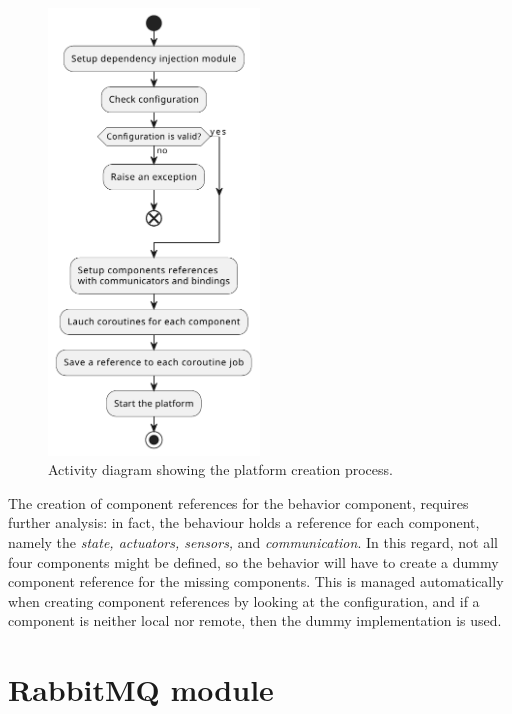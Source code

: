 \begin{figure}
	\centering
	\includegraphics[width=0.5\textwidth]{figures/platform-setup-sequence.pdf}
	\caption{Activity diagram showing the platform creation process.}
	\label{fig:platform-configuration}
\end{figure}

The creation of component references for the behavior component, requires further analysis: in fact, the behaviour holds a reference for each
component, namely the \emph{state, actuators, sensors,} and \emph{communication}.
In this regard, not all four components might be defined, so the behavior will have to create a dummy component reference for the missing components.
This is managed automatically when creating component references by looking at the configuration, and if a component is neither local nor remote,
then the dummy implementation is used.


\section{RabbitMQ module}
\label{sec:rabbitmq-module-impl}


